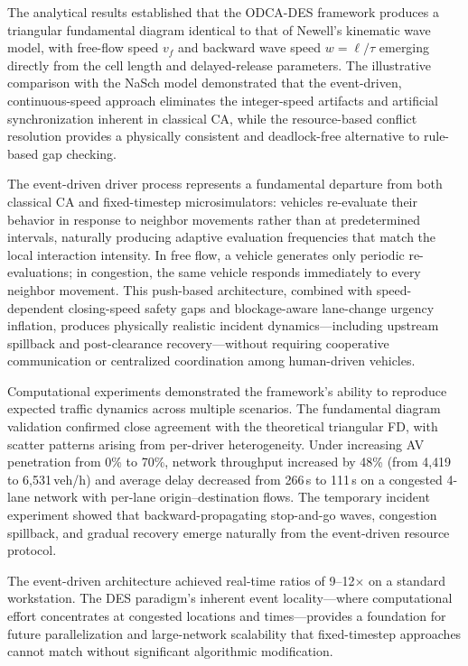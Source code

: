 \documentclass[review,authoryear]{elsarticle}
\begin{document}
The analytical results established that the ODCA-DES framework produces a triangular fundamental diagram identical to that of Newell's kinematic wave model, with free-flow speed $v_f$ and backward wave speed $w = \ell/\tau$ emerging directly from the cell length and delayed-release parameters. The illustrative comparison with the NaSch model demonstrated that the event-driven, continuous-speed approach eliminates the integer-speed artifacts and artificial synchronization inherent in classical CA, while the resource-based conflict resolution provides a physically consistent and deadlock-free alternative to rule-based gap checking.

The event-driven driver process represents a fundamental departure from both classical CA and fixed-timestep microsimulators: vehicles re-evaluate their behavior in response to neighbor movements rather than at predetermined intervals, naturally producing adaptive evaluation frequencies that match the local interaction intensity. In free flow, a vehicle generates only periodic re-evaluations; in congestion, the same vehicle responds immediately to every neighbor movement. This push-based architecture, combined with speed-dependent closing-speed safety gaps and blockage-aware lane-change urgency inflation, produces physically realistic incident dynamics---including upstream spillback and post-clearance recovery---without requiring cooperative communication or centralized coordination among human-driven vehicles.

Computational experiments demonstrated the framework's ability to reproduce expected traffic dynamics across multiple scenarios. The fundamental diagram validation confirmed close agreement with the theoretical triangular FD, with scatter patterns arising from per-driver heterogeneity. Under increasing AV penetration from 0\% to 70\%, network throughput increased by 48\% (from 4{,}419 to 6{,}531\,veh/h) and average delay decreased from 266\,s to 111\,s on a congested 4-lane network with per-lane origin--destination flows. The temporary incident experiment showed that backward-propagating stop-and-go waves, congestion spillback, and gradual recovery emerge naturally from the event-driven resource protocol.

The event-driven architecture achieved real-time ratios of 9--12$\times$ on a standard workstation. The DES paradigm's inherent event locality---where computational effort concentrates at congested locations and times---provides a foundation for future parallelization and large-network scalability that fixed-timestep approaches cannot match without significant algorithmic modification.
\end{document}
